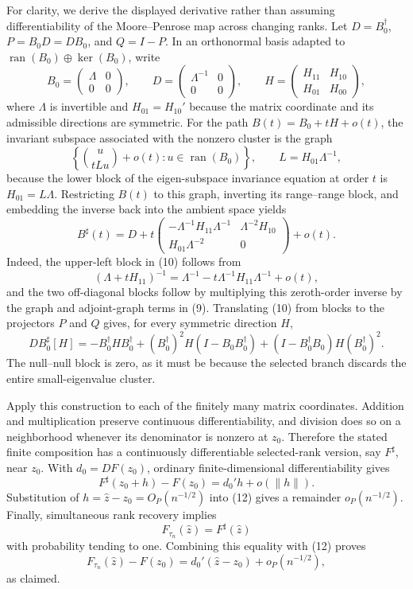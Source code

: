 For clarity, we derive the displayed derivative rather than assuming differentiability of the Moore--Penrose map across changing ranks.  Let \(D=B_0^\dagger\), \(P=B_0D=DB_0\), and \(Q=I-P\).  In an orthonormal basis adapted to \(\operatorname{ran}(B_0)\oplus\ker(B_0)\), write
\[
 B_0=\begin{pmatrix}\Lambda&0\\0&0\end{pmatrix},
 \qquad
 D=\begin{pmatrix}\Lambda^{-1}&0\\0&0\end{pmatrix},
 \qquad
 H=\begin{pmatrix}H_{11}&H_{10}\\H_{01}&H_{00}\end{pmatrix},
 \tag{8}
\]
where \(\Lambda\) is invertible and \(H_{01}=H_{10}'\) because the matrix coordinate and its admissible directions are symmetric.  For the path \(B(t)=B_0+tH+o(t)\), the invariant subspace associated with the nonzero cluster is the graph
\[
 \left\{\binom{u}{tLu}+o(t):u\in\operatorname{ran}(B_0)\right\},
 \qquad
 L=H_{01}\Lambda^{-1},
 \tag{9}
\]
because the lower block of the eigen-subspace invariance equation at order \(t\) is \(H_{01}=L\Lambda\).  Restricting \(B(t)\) to this graph, inverting its range--range block, and embedding the inverse back into the ambient space yields
\[
 B^{\sharp}(t)
 =D+t
 \begin{pmatrix}
 -\Lambda^{-1}H_{11}\Lambda^{-1}&\Lambda^{-2}H_{10}\\
 H_{01}\Lambda^{-2}&0
 \end{pmatrix}+o(t).
 \tag{10}
\]
Indeed, the upper-left block in (10) follows from
\[
 (\Lambda+tH_{11})^{-1}
 =\Lambda^{-1}-t\Lambda^{-1}H_{11}\Lambda^{-1}+o(t),
\]
and the two off-diagonal blocks follow by multiplying this zeroth-order inverse by the graph and adjoint-graph terms in (9).  Translating (10) from blocks to the projectors \(P\) and \(Q\) gives, for every symmetric direction \(H\),
\[
 D B_0^{\sharp}[H]
 =-B_0^\dagger H B_0^\dagger
 +(B_0^\dagger)^2H(I-B_0B_0^\dagger)
 +(I-B_0^\dagger B_0)H(B_0^\dagger)^2.
 \tag{11}
\]
The null--null block is zero, as it must be because the selected branch discards the entire small-eigenvalue cluster.

Apply this construction to each of the finitely many matrix coordinates.  Addition and multiplication preserve continuous differentiability, and division does so on a neighborhood whenever its denominator is nonzero at \(z_0\).  Therefore the stated finite composition has a continuously differentiable selected-rank version, say \(F^\sharp\), near \(z_0\).  With \(d_0=DF(z_0)\), ordinary finite-dimensional differentiability gives
\[
 F^\sharp(z_0+h)-F(z_0)=d_0'h+o(\|h\|).
 \tag{12}
\]
Substitution of \(h=\widehat z-z_0=O_P(n^{-1/2})\) into (12) gives a remainder \(o_P(n^{-1/2})\).  Finally, simultaneous rank recovery implies
\[
 F_{\tau_n}(\widehat z)=F^\sharp(\widehat z)
\]
with probability tending to one.  Combining this equality with (12) proves
\[
 F_{\tau_n}(\widehat z)-F(z_0)
 =d_0'(\widehat z-z_0)+o_P(n^{-1/2}),
\]
as claimed.

